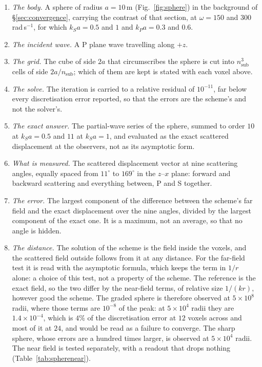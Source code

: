 \documentclass[preprint,review,12pt]{elsarticle}
\begin{document}
\begin{enumerate}
\item \emph{The body.} A sphere of radius $a=10$\,m (Fig.~\ref{fig:sphere}) in the background of \S\ref{sec:convergence},
carrying the contrast of that section, at $\omega=150$ and $300$\,rad\,s$^{-1}$, for which $k_Sa=0.5$ and
$1$ and $k_Pa=0.3$ and $0.6$.
\item \emph{The incident wave.} A P plane wave travelling along $+z$.
\item \emph{The grid.} The cube of side $2a$ that circumscribes the sphere is cut into
$n_{\mathrm{sub}}^3$ cells of side $2a/n_{\mathrm{sub}}$; which of them are kept is stated with each
voxel above.
\item \emph{The solve.} The iteration is carried to a relative residual of $10^{-11}$, far below every
discretisation error reported, so that the errors are the scheme's and not the solver's.
\item \emph{The exact answer.} The partial-wave series of the sphere, summed to order $10$ at
$k_Sa=0.5$ and $11$ at $k_Sa=1$, and evaluated as the exact scattered displacement at the observers,
not as its asymptotic form.
\item \emph{What is measured.} The scattered displacement vector at nine scattering angles, equally
spaced from $11^\circ$ to $169^\circ$ in the $z$--$x$ plane: forward and backward scattering and
everything between, P and S together.
\item \emph{The error.} The largest component of the difference between the scheme's far field and the
exact displacement over the nine angles, divided by the largest component of the exact one. It is a
maximum, not an average, so that no angle is hidden.
\item \emph{The distance.} The solution of the scheme is the field inside the voxels, and the
scattered field outside follows from it at any distance. For the far-field test it is read with the
asymptotic formula, which keeps the term in $1/r$ alone: a choice of this test, not a property of the
scheme. The reference is the exact field, so the two differ by the near-field terms, of relative size
$1/(kr)$, however good the scheme.
The graded sphere is therefore observed at $5\times10^8$ radii, where those terms are $10^{-8}$ of the
peak: at $5\times10^4$ radii they are $1.4\times10^{-4}$, which is $4\%$ of the discretisation error
at $12$ voxels across and most of it at $24$, and would be read as a failure to converge. The sharp
sphere, whose errors are a hundred times larger, is observed at $5\times10^4$ radii. The near field is
tested separately, with a readout that drops nothing (Table~\ref{tab:spherenear}).
\end{enumerate}
\end{document}
